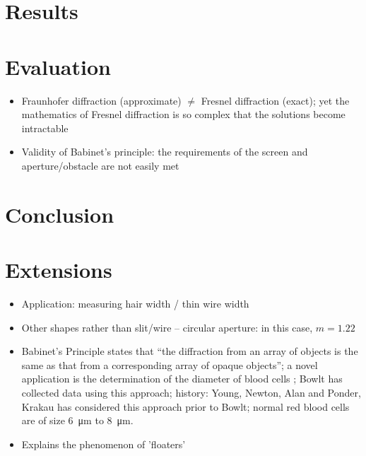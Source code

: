 \documentclass[a4paper, 12pt]{article}
\begin{document}
\section*{Results}

\section*{Evaluation}
\begin{itemize}
\itemsep 0em
    \item Fraunhofer diffraction (approximate) $\neq$ Fresnel diffraction (exact); yet the mathematics of Fresnel diffraction is so complex that the solutions become intractable
    \item Validity of Babinet's principle: the requirements of the screen and aperture/obstacle are not easily met \cite{validity}
\end{itemize}

\section*{Conclusion}

\section*{Extensions}
\begin{itemize}
\itemsep 0em
    \item Application: measuring hair width / thin wire width \cite{wire_measurement}
    \item Other shapes rather than slit/wire -- circular aperture: in this case, $m = 1.22$
    \item Babinet's Principle states that ``the diffraction from an array of objects is the same as that from a corresponding array of opaque objects''; a novel application is the determination of the diameter of blood cells \cite{blood_cell}; Bowlt \cite{blood_cell_success} has collected data using this approach; history: Young, Newton, Alan and Ponder, Krakau has considered this approach prior to Bowlt; normal red blood cells are of size \SI{6}{\um} to \SI{8}{\um}.
    \item Explains the phenomenon of 'floaters'
\end{itemize}

\printbibliography
\end{document}
